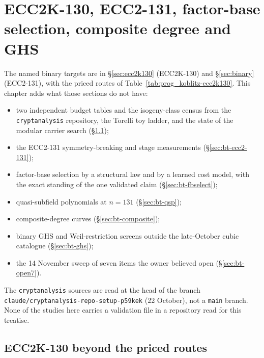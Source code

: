 \chapter{ECC2K-130, ECC2-131, factor-base selection, composite degree and GHS}\label{ch:binarytargets}

The named binary targets are in \S\ref{sec:ecc2k130} (ECC2K-130) and
\S\ref{sec:binary} (ECC2-131), with the priced routes of
Table~\ref{tab:prog_koblitz-ecc2k130}. This chapter adds what those sections
do not have:
\begin{itemize}
\item two independent budget tables and the isogeny-class census from the
  \texttt{cryptanalysis} repository, the Torelli toy ladder, and the state of
  the modular carrier search (\S\ref{sec:bt-ecc2k130});
\item the ECC2-131 symmetry-breaking and stage measurements
  (\S\ref{sec:bt-ecc2-131});
\item factor-base selection by a structural law and by a learned cost
  model, with the exact standing of the one validated claim
  (\S\ref{sec:bt-fbselect});
\item quasi-subfield polynomials at $n=131$ (\S\ref{sec:bt-qsp});
\item composite-degree curves (\S\ref{sec:bt-composite});
\item binary GHS and Weil-restriction screens outside the late-October cubic
  catalogue (\S\ref{sec:bt-ghs});
\item the 14 November sweep of seven items the owner believed open
  (\S\ref{sec:bt-open7}).
\end{itemize}
The \texttt{cryptanalysis} sources are read at the head of the branch
\texttt{claude/cryptanalysis-repo-setup-p59kek} (22 October), not a
\texttt{main} branch. None of the studies here carries a validation file in
a repository read for this treatise.

\section{ECC2K-130 beyond the priced routes}\label{sec:bt-ecc2k130}

